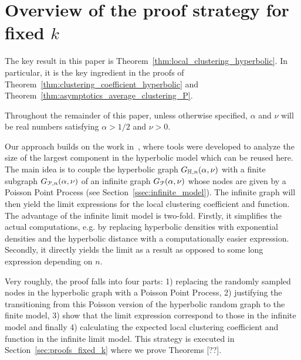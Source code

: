 \section{Overview of the proof strategy for fixed $k$}\label{sec:proof_outline}



The key result in this paper is Theorem~\ref{thm:local_clustering_hyperbolic}. In particular, it is the key ingredient in the proofs of Theorem~\ref{thm:clustering_coefficient_hyperbolic} and Theorem~\ref{thm:asymptotics_average_clustering_P}.

\begin{remark}
Throughout the remainder of this paper, unless otherwise specified, $\alpha$ and $\nu$ will be real numbers satisfying $\alpha > 1/2$ and $\nu > 0$.
\end{remark}

Our approach builds on the work in~\cite{fountoulakis2018law}, where tools were developed to analyze the size of the largest component in the hyperbolic model which can be reused here. The main idea is to couple the hyperbolic graph $G_{\mathbb{H}, n}(\alpha, \nu)$ with a finite subgraph $G_{{\mathcal P},n}(\alpha,\nu)$ of an infinite graph $G_{{\mathcal P}}(\alpha,\nu)$ whose nodes are given by a Poisson Point Process (see Section~\ref{ssec:infinite_model}). The infinite graph will then yield the limit expressions for the local clustering coefficient and function.
The advantage of the infinite limit model is two-fold. Firstly, it simplifies the actual computations, e.g. by replacing hyperbolic densities with exponential densities and the hyperbolic distance with a computationally easier expression. Secondly, it directly yields the limit as a result as opposed to some long expression depending on $n$. 

Very roughly, the proof falls into four parts: 1) replacing the randomly sampled nodes in the hyperbolic graph with a Poisson Point Process, 2) justifying the transitioning from this Poisson version of the hyperbolic random graph to the finite model, 3) show that the limit expression correspond to those in the infinite model and finally 4) calculating the expected local clustering coefficient and function in the infinite limit model.  This strategy is executed in Section~\ref{sec:proofs_fixed_k} where we prove Theorems [??].


